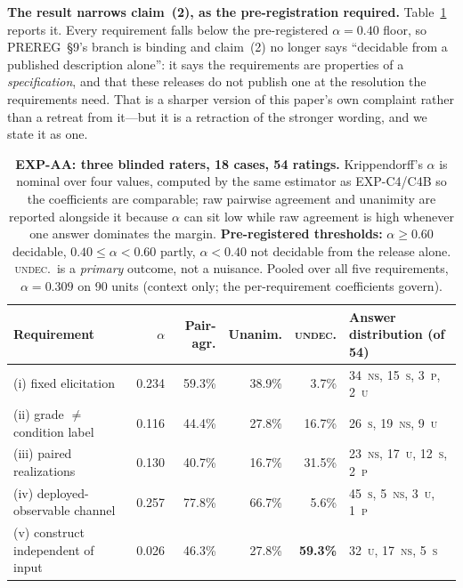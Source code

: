 \textbf{The result narrows claim~(2), as the pre-registration required.}
Table~\ref{tab:audit_agreement} reports it. Every requirement falls below the pre-registered
$\alpha\!=\!0.40$ floor, so PREREG~§9's branch is binding and claim~(2) no longer says
``decidable from a published description alone'': it says the requirements are properties of a
\emph{specification}, and that these releases do not publish one at the resolution the requirements need.
That is a sharper version of this paper's own complaint rather than a retreat from it---but it is a
retraction of the stronger wording, and we state it as one.

\begin{table}[htbp]
\centering
\caption{\small\textbf{EXP-AA: three blinded raters, 18 cases, 54 ratings.} Krippendorff's $\alpha$ is
nominal over four values, computed by the same estimator as EXP-C4/C4B so the coefficients are comparable;
raw pairwise agreement and unanimity are reported alongside it because $\alpha$ can sit low while raw
agreement is high whenever one answer dominates the margin. \textbf{Pre-registered thresholds:}
$\alpha\!\geq\!0.60$ decidable, $0.40\!\leq\!\alpha\!<\!0.60$ partly, $\alpha\!<\!0.40$ not decidable from
the release alone. \textsc{undec.}~is a \emph{primary} outcome, not a nuisance. Pooled over all five
requirements, $\alpha\!=\!0.309$ on 90 units (context only; the per-requirement coefficients govern).}
\label{tab:audit_agreement}
\begin{scriptsize}
\setlength{\tabcolsep}{5pt}
\begin{tabular}{@{}lrrrrl@{}}
\toprule
\textbf{Requirement} & \textbf{$\alpha$} & \textbf{Pair-agr.} & \textbf{Unanim.} & \textbf{\textsc{undec.}} & \textbf{Answer distribution (of 54)} \\
\midrule
(i) fixed elicitation & 0.234 & 59.3\% & 38.9\% & 3.7\% & 34~\textsc{ns}, 15~\textsc{s}, 3~\textsc{p}, 2~\textsc{u} \\
(ii) grade $\neq$ condition label & 0.116 & 44.4\% & 27.8\% & 16.7\% & 26~\textsc{s}, 19~\textsc{ns}, 9~\textsc{u} \\
(iii) paired realizations & 0.130 & 40.7\% & 16.7\% & 31.5\% & 23~\textsc{ns}, 17~\textsc{u}, 12~\textsc{s}, 2~\textsc{p} \\
(iv) deployed-observable channel & 0.257 & 77.8\% & 66.7\% & 5.6\% & 45~\textsc{s}, 5~\textsc{ns}, 3~\textsc{u}, 1~\textsc{p} \\
(v) construct independent of input & 0.026 & 46.3\% & 27.8\% & \textbf{59.3\%} & 32~\textsc{u}, 17~\textsc{ns}, 5~\textsc{s} \\
\bottomrule
\end{tabular}
\end{scriptsize}
\end{table}

